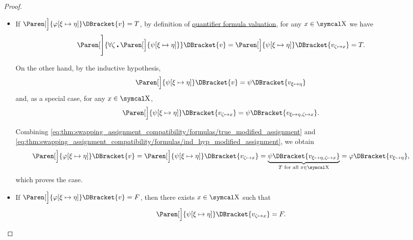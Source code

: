 \begin{proof}
\begin{itemize}
\begin{itemize}
      \begin{itemize}
        \item If \( \Paren[\Big]{\varphi[\xi \mapsto \eta]}\DBracket{v} = T \), by definition of \hyperref[def:first_order_valuation/formula_valuation]{quantifier formula valuation}, for any \( x \in \CX \) we have
        \begin{equation}\label{eq:thm:swapping_assignment_compatibility/formulas/true_modified_assignment}
          \Paren[\Bigg]{\forall \zeta \centerdot \Paren[\Big]{ \psi[\xi \mapsto \eta] }}\DBracket{v}
          =
          \Paren[\Big]{\psi[\xi \mapsto \eta]}\DBracket{v_{\zeta \mapsto x}}
          =
          T.
        \end{equation}

        On the other hand, by the inductive hypothesis,
        \begin{equation*}
          \Paren[\Big]{ \psi[\xi \mapsto \eta] }\DBracket{v} = \psi\DBracket{v_{\xi \mapsto \eta}}
        \end{equation*}
        and, as a special case, for any \( x \in \CX \),
        \begin{equation}\label{eq:thm:swapping_assignment_compatibility/formulas/ind_hyp_modified_assignment}
          \Paren[\Big]{ \psi[\xi \mapsto \eta] }\DBracket{v_{\zeta \mapsto x}} = \psi\DBracket{v_{\xi \mapsto \eta, \zeta \mapsto x}}.
        \end{equation}

        Combining \eqref{eq:thm:swapping_assignment_compatibility/formulas/true_modified_assignment} and \eqref{eq:thm:swapping_assignment_compatibility/formulas/ind_hyp_modified_assignment}, we obtain
        \begin{equation*}
          \Paren[\Big]{ \varphi[\xi \mapsto \eta] }\DBracket{v}
          =
          \Paren[\Big]{ \psi[\xi \mapsto \eta] }\DBracket{v_{\zeta \mapsto x}}
          =
          \underbrace{\psi\DBracket{v_{\xi \mapsto \eta, \zeta \mapsto x}}}_{T \T{for all} x \in \CX}
          =
          \varphi\DBracket{v_{\xi \mapsto \eta}},
        \end{equation*}
        which proves the case.

        \item If \( \Paren[\Big]{\varphi[\xi \mapsto \eta]}\DBracket{v} = F \), then there exists \( x \in \CX \) such that
        \begin{equation*}
          \Paren[\Big]{\psi[\xi \mapsto \eta]}\DBracket{v_{\zeta \mapsto x}} = F.
        \end{equation*}


\end{itemize}
\end{itemize}
\end{itemize}
\end{proof}
